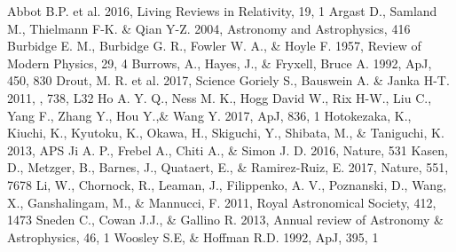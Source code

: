 \documentclass[a4paper,fleqn,usenatbib]{mnras}
\begin{document}
	
	\begin{thebibliography}{99}
		Abbot B.P. et al. 2016, Living Reviews in Relativity, 19, 1
		Argast D., Samland M., Thielmann F-K. \& Qian Y-Z. 2004, Astronomy and Astrophysics, 416
		Burbidge E. M., Burbidge G. R., Fowler W. A., \& Hoyle F. 1957, Review of Modern Physics, 29, 4
		Burrows, A., Hayes, J., \& Fryxell, Bruce A. 1992, ApJ, 450, 830
		Drout, M. R. et al. 2017, Science
		Goriely S., Bauswein A. \& Janka H-T. 2011, , 738, L32
		Ho A. Y. Q., Ness M. K., Hogg David W., Rix H-W., Liu C., Yang F., Zhang Y., Hou Y.,\& Wang Y. 2017, ApJ, 836, 1
		Hotokezaka, K., Kiuchi, K., Kyutoku, K., Okawa, H., Skiguchi, Y., Shibata, M., \& Taniguchi, K. 2013, APS
		Ji A. P., Frebel A., Chiti A., \& Simon J. D. 2016, Nature, 531
		Kasen, D., Metzger, B., Barnes, J., Quataert, E., \& Ramirez-Ruiz, E. 2017, Nature, 551, 7678
		Li, W., Chornock, R., Leaman, J., Filippenko, A. V., Poznanski, D., Wang, X., Ganshalingam, M., \& Mannucci, F. 2011, Royal Astronomical Society, 412, 1473
		Sneden C., Cowan J.J., \& Gallino R. 2013, Annual review of Astronomy \& Astrophysics, 46, 1
		Woosley S.E, \& Hoffman R.D. 1992, ApJ, 395, 1
	\end{thebibliography}
	
\end{document}
